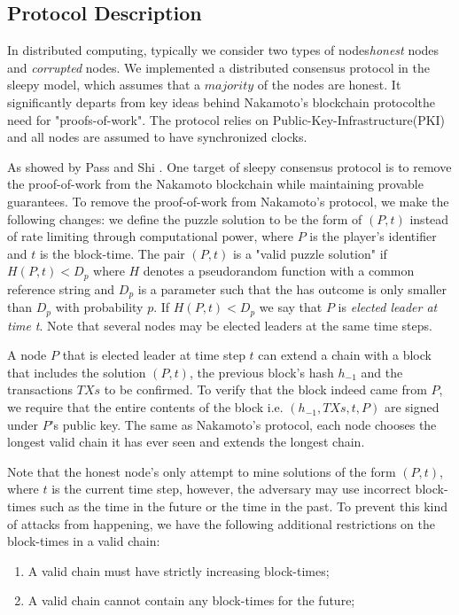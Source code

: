 \documentclass[
10pt, %
a4paper, %
oneside, %
headinclude,footinclude, %
BCOR5mm, %
]{scrartcl}
\begin{document}
\subsection{Protocol Description}
In distributed computing, typically we consider two types of nodes\textemdash\textit{honest} nodes and \textit{corrupted} nodes. We implemented a distributed consensus protocol in the sleepy model, which assumes that a $majority$ of the nodes are honest. It significantly departs from key ideas behind Nakamoto's blockchain protocol\textemdash the need for "proofs-of-work". The protocol relies on Public-Key-Infrastructure(PKI) and all nodes are assumed to have synchronized clocks.
\par As showed by Pass and Shi \cite{cryptoeprint:2016:918}. One target of sleepy consensus protocol is to remove the proof-of-work from the Nakamoto blockchain while maintaining provable guarantees. To remove the proof-of-work from Nakamoto's protocol, we make the following changes: we define the puzzle solution to be the form of $(P, t)$ instead of rate limiting through computational power, where $P$ is the player's identifier and $t$ is the block-time. The pair $(P, t)$ is a "valid puzzle solution" if $H(P,t) < D_p$ where $H$ denotes a pseudorandom function with a common reference string and $D_p$ is a parameter such that the has outcome is only smaller than $D_p$ with probability $p$. If $H(P,t) < D_p$ we say that $P$ is \textit{elected leader at time t}. Note that several nodes may be elected leaders at the same time steps.
\par A node $P$ that is elected leader at time step $t$ can extend a chain with a block that includes the solution $(P, t)$, the previous block's hash $h_{-1}$ and the transactions $TXs$ to be confirmed. To verify that the block indeed came from $P$, we require that the entire contents of the block i.e. $(h_{-1}, TXs, t, P)$ are signed under $P$'s public key. The same as Nakamoto's protocol, each node chooses the longest valid chain it has ever seen and extends the longest chain.
\par Note that the honest node's only attempt to mine solutions of the form $(P, t)$, where $t$ is the current time step, however, the adversary may use incorrect block-times such as the time in the future or the time in the past. To prevent this kind of attacks from happening, we have the following additional restrictions on the block-times in a valid chain:
\begin{enumerate}
    \item A valid chain must have strictly increasing block-times;
    \item A valid chain cannot contain any block-times for the future;
\end{enumerate}
\end{document}
